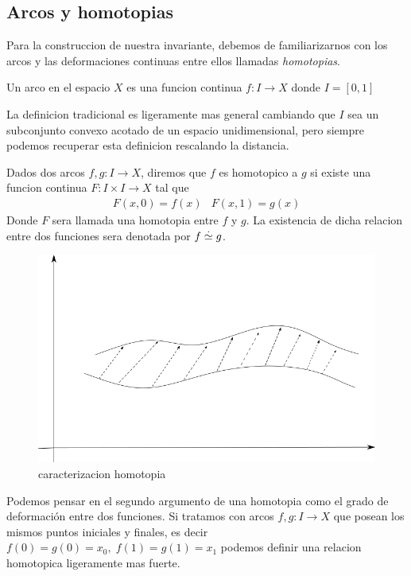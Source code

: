 \subsection{Arcos y homotopias}
Para la construccion de nuestra invariante, debemos de familiarizarnos
con los arcos y las deformaciones continuas entre ellos llamadas
\emph{homotopias}.

\begin{definicion}[Arco]
  Un arco en el espacio \(X\) es una funcion continua \(f : I \to X \)
  donde \(I = [0,1]\)
\end{definicion}
La definicion tradicional es ligeramente mas general cambiando que \(I\)
sea un subconjunto convexo acotado de un espacio unidimensional, pero
siempre podemos recuperar esta definicion rescalando la distancia.

\begin{definicion}[Homotopia]
  Dados dos arcos \(f,g : I \to X\), diremos que \(f\) es homotopico a
  \(g\) si existe una funcion continua \(F : I \times I \to X \) tal que
  \[ \begin{matrix}
      F (x, 0) = f(x) & F (x, 1) = g(x)
     \end{matrix}
  \]
  Donde \(F\) sera llamada una homotopia entre \(f\) y \(g\). La
  existencia de dicha relacion entre dos funciones sera denotada por \(f
  \stackrel{.}{\simeq} g\).
\end{definicion}
\begin{figure}[h]
  \centering
  \includegraphics[scale=0.3]{./imagenes/homotopia.png}
  \caption{caracterizacion homotopia}
  \label{fig:homotopia-entre-funciones}
\end{figure}
Podemos pensar en el segundo argumento de una homotopia como el grado de
deformación entre dos funciones.
Si tratamos con arcos \(f,g : I \to X\) que posean los mismos puntos
iniciales y finales, es decir \(f(0) = g(0) = x_0, \; f(1) = g(1) =
x_1 \) podemos definir una relacion homotopica ligeramente mas fuerte.

